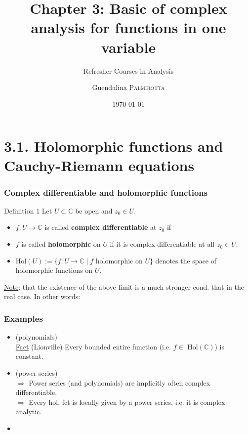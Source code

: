 \documentclass[10pt]{beamer}
\title[Refresher Courses in Analysis] %
{Chapter 3: Basic of complex analysis for functions in one variable}
\subtitle{Refresher Courses in Analysis}
\author[Guendalina \textsc{Palmirotta}]{Guendalina \textsc{Palmirotta}}
\institute[]{University of Luxembourg, Department of Mathematics}
\date[]{\today}
\newcommand{\C}{\mathbb{C}}
\newcommand{\nologo}{\setbeamertemplate{logo}{}}
\begin{document}
\begin{frame}
\titlepage
\end{frame}

{\nologo



\section{3.1. Holomorphic functions and Cauchy-Riemann equations}

\begin{frame}
\frametitle{Complex differentiable and holomorphic functions}
\begin{alertblock}{Definition 1}
Let $U \subset \C$ be open and $z_0 \in U$.
\begin{itemize}
\item[(i)] $f:U \rightarrow \C$ is called \textbf{complex differentiable} at $z_0$ if
\vspace{0.5cm}
\item[(ii)] $f$ is called \textbf{holomorphic} on $U$ if it is complex differentiable at all $z_0 \in U$.
\item[(iii)] Hol$(U):=\{f: U \rightarrow \C \;| \; f$ holomorphic on $U\}$ denotes the space of holomorphic functions on $U$.
\end{itemize}
\end{alertblock}
\vspace{0.2cm}
\underline{Note}: that the existence of the above limit is a much stronger cond. that in the real case.
In other words:
\vspace{1cm}
\end{frame}

\begin{frame}
\frametitle{Examples}
\begin{itemize}
\item[1)] (polynomials)\;\\
\vspace{1cm}
\underline{Fact} (Lionville) Every bounded entire function (i.e. $f \in$ Hol$(\C)$) is constant.\\
\vspace{0.2cm}
\item[2)] (power series)\;\\
\vspace{1.5cm}
$\Rightarrow$ Power series (and polynomials) are implicitly often complex differentiable.\\
$\Rightarrow$ Every hol. fct is locally given by a power series, i.e. it is complex analytic.
\vspace{0.2cm}
\item[3)]\;\\
\vspace{1.5cm}
\end{itemize}
\end{frame}

}
\end{document}
